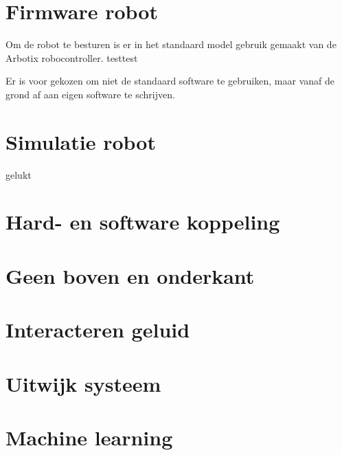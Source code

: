 \documentclass[10pt,a4paper]{article}
\begin{document}
\section{Firmware robot}
Om de robot te besturen is er in het standaard model gebruik gemaakt van de Arbotix robocontroller. 
testtest

Er is voor gekozen om niet de standaard software te gebruiken, maar vanaf de grond af aan eigen software te schrijven.

\section{Simulatie robot}
gelukt

\section{Hard- en software koppeling}


\section{Geen boven en onderkant}

\section{Interacteren geluid}

\section{Uitwijk systeem}

\section{Machine learning}
\end{document}
